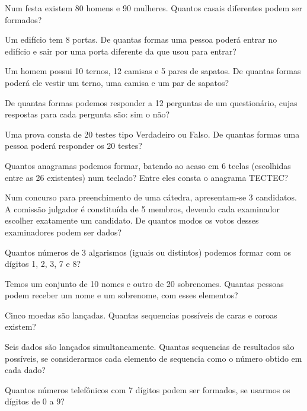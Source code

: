 	\item Num festa existem 80 homens e 90 mulheres. Quantos casais diferentes podem ser formados?
	
	\item Um edifício tem 8 portas. De quantas formas uma pessoa poderá entrar no edifício e sair por uma porta diferente da que usou para entrar?
	
	\item Um homem possui 10 ternos, 12 camisas e 5 pares de sapatos. De quantas formas poderá ele vestir um terno, uma camisa e um par de sapatos?
	
	\item De quantas formas podemos responder a 12 perguntas de um questionário, cujas respostas para cada pergunta são: sim o não?
	
	\item Uma prova consta de 20 testes tipo Verdadeiro ou Falso. De quantas formas uma pessoa poderá responder os 20 testes?
	
	\item Quantos anagramas podemos formar, batendo ao acaso em 6 teclas (escolhidas entre as 26 existentes) num teclado? Entre eles consta o anagrama TECTEC?
	
	\item Num concurso para preenchimento de uma cátedra, apresentam-se 3 candidatos. A comissão julgador é constituída de 5 membros, devendo cada examinador escolher exatamente um candidato. De quantos modos os votos desses examinadores podem ser dados?
	
	\item Quantos números de 3 algarismos (iguais ou distintos) podemos formar com os dígitos 1, 2, 3, 7 e 8?
	
	\item Temos um conjunto de 10 nomes e outro de 20 sobrenomes. Quantas pessoas podem receber um nome e um sobrenome, com esses elementos?
	
	\item Cinco moedas são lançadas. Quantas sequencias possíveis de caras e coroas existem?
	
	\item Seis dados são lançados simultaneamente. Quantas sequencias de resultados são possíveis, se considerarmos cada elemento de sequencia como o número obtido em cada dado?
	
	\item Quantos números telefônicos com 7 dígitos podem ser formados, se usarmos os dígitos de 0 a 9?
	
